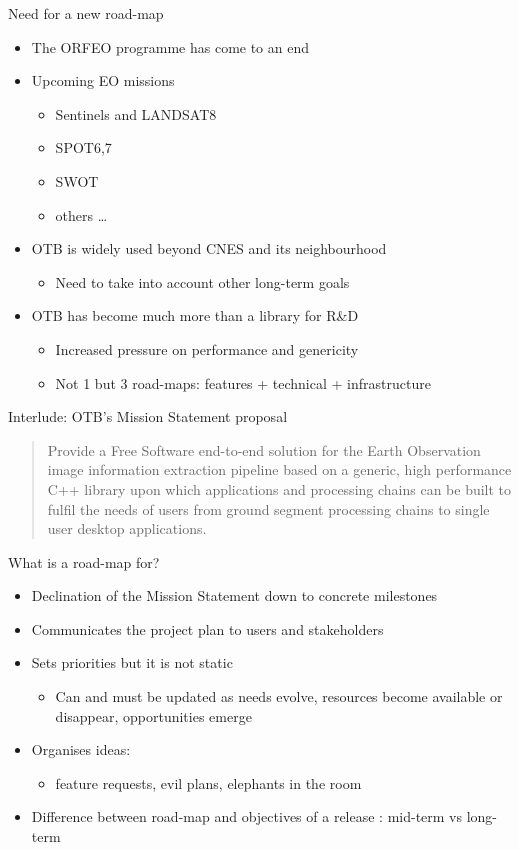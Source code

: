 \documentclass[8pt]{beamer}
\begin{document}
\begin{frame}[label=sec-4]{Need for a new road-map}
\begin{itemize}
\item The ORFEO programme has come to an end
\item Upcoming EO missions
\begin{itemize}
\item Sentinels and LANDSAT8
\item SPOT6,7
\item SWOT
\item others \ldots{}
\end{itemize}
\item OTB is widely used beyond CNES and its neighbourhood
\begin{itemize}
\item Need to take into account other long-term goals
\end{itemize}
\item OTB has become much more than a library for R\&D
\begin{itemize}
\item Increased pressure on performance and genericity
\item Not 1 but 3 road-maps: features + technical + infrastructure
\end{itemize}
\end{itemize}
\end{frame}
\begin{frame}[label=sec-5]{Interlude: OTB's Mission Statement proposal}
\begin{quote}
Provide a Free Software end-to-end solution for the Earth Observation
image information extraction pipeline based on a generic, high
performance C++ library upon which applications and processing chains
can be built to fulfil the needs of users from ground segment
processing chains to single user desktop applications.
\end{quote}
\end{frame}
\begin{frame}[label=sec-6]{What is a road-map for?}
\begin{itemize}
\item Declination of the Mission Statement down to concrete milestones
\item Communicates the project plan to users and stakeholders
\item Sets priorities but it is not static
\begin{itemize}
\item Can and must be updated as needs evolve, resources become
available or disappear, opportunities emerge
\end{itemize}
\item Organises ideas:
\begin{itemize}
\item feature requests, evil plans, elephants in the room
\end{itemize}
\item Difference between road-map and objectives of a release : mid-term
vs long-term
\end{itemize}
\end{frame}
\end{document}

